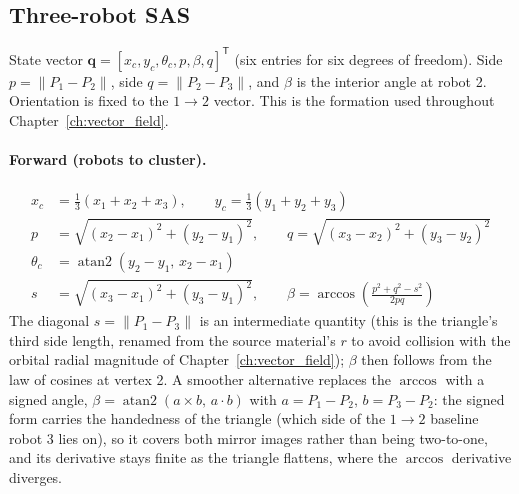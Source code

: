 \documentclass[12pt, letterpaper, oneside]{report}
\begin{document}
\subsection{Three-robot SAS}
\label{sec:atom_sas}

State vector $\mathbf{q}=[x_c,y_c,\theta_c,p,\beta,q]^{\mathsf T}$ (six
entries for six degrees of freedom). Side $p=\lVert P_1-P_2\rVert$, side
$q=\lVert P_2-P_3\rVert$, and $\beta$ is the interior angle at robot 2.
Orientation is fixed to the $1\to2$ vector. This is the formation used
throughout Chapter~\ref{ch:vector_field}.

\paragraph{Forward (robots to cluster).}
\begin{align}
x_c &= \tfrac{1}{3}(x_1+x_2+x_3), \qquad y_c = \tfrac{1}{3}(y_1+y_2+y_3) \\
p &= \sqrt{(x_2-x_1)^2+(y_2-y_1)^2}, \qquad q = \sqrt{(x_3-x_2)^2+(y_3-y_2)^2} \\
\theta_c &= \operatorname{atan2}(y_2-y_1,\,x_2-x_1) \\
s &= \sqrt{(x_3-x_1)^2+(y_3-y_1)^2}, \qquad \beta = \arccos\!\left(\frac{p^2+q^2-s^2}{2pq}\right)
\end{align}
The diagonal $s=\lVert P_1-P_3\rVert$ is an intermediate quantity (this is
the triangle's third side length, renamed from the source material's $r$ to
avoid collision with the orbital radial magnitude of
Chapter~\ref{ch:vector_field}); $\beta$ then follows from the law of cosines
at vertex 2. A smoother alternative replaces the $\arccos$ with a signed
angle, $\beta = \operatorname{atan2}(a\times b,\,a\cdot b)$ with
$a=P_1-P_2,\,b=P_3-P_2$: the signed form carries the handedness of the
triangle (which side of the $1\to2$ baseline robot 3 lies on), so it covers
both mirror images rather than being two-to-one, and its derivative stays
finite as the triangle flattens, where the $\arccos$ derivative diverges.
\end{document}
